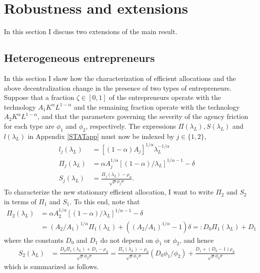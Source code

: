 \documentclass[11pt]{article}
\theoremstyle{plain}
\theoremstyle{definition} %
\begin{document}
\section{Robustness and extensions} \label{robust_app}

In this section I discuss two extensions of the main result. 

\subsection{Heterogeneous entrepreneurs} \label{hetero_ent}

In this section I show how the characterization of efficient allocations and the above decentralization change in the presence of two types of entrepreneurs. Suppose that a fraction $\zeta \in [0,1]$ of the entrepreneurs operate with the technology $A_1K^{\alpha}L^{1-\alpha}$ and the remaining fraction operate with the technology $A_2K^{\alpha}L^{1-\alpha}$, and that the parameters governing the severity of the agency friction for each type are $\phi_1$ and $\phi_2$, respectively. The expressions $\Pi(\lambda_L), S(\lambda_L)$ and $l(\lambda_L)$ in Appendix \ref{STATapp} must now be indexed by $j \in \{1,2\}$,
\begin{align*}
l_j(\lambda_L) & = [(1-\alpha)A_j]^{1/\alpha}\lambda_L^{-1/\alpha}
\\ \Pi_j(\lambda_L) & = \alpha A_j^{1/\alpha} [(1-\alpha)/\lambda_L]^{1/\alpha-1} - \delta
\\ S_j(\lambda_L) & = \frac{\Pi_j(\lambda_L) - \rho_S}{\sqrt{\rho} \phi_j \sigma}.
\end{align*}
To characterize the new stationary efficient allocation, I want to write $\Pi_2$ and $S_2$ in terms of $\Pi_1$ and $S_1$. To this end, note that
\begin{equation}
\begin{aligned}
\Pi_2(\lambda_L) & = \alpha A_2^{1/\alpha} [(1-\alpha)/\lambda_L]^{1/\alpha-1} - \delta
\\ & = (A_2/A_1)^{1/\alpha} \Pi_1(\lambda_L) + ((A_2/A_1)^{1/\alpha}-1)\delta
=: D_0\Pi_1(\lambda_L) + D_1
\end{aligned}
\label{pinned}
\end{equation}
where the constants $D_0$ and $D_1$ do not depend on $\phi_1$ or $\phi_2$, and hence
\begin{align*} %
S_2(\lambda_L) & = \frac{D_0\Pi_1(\lambda_L) + D_1 - \rho_S}{\sqrt{\rho} \phi_2 \sigma}
 = \frac{\Pi_1(\lambda_L) - \rho_S}{\sqrt{\rho} \phi_1 \sigma} (D_0\phi_1/\phi_2) + \frac{D_1 + (D_0 - 1)\rho_S}{\sqrt{\rho} \phi_2 \sigma} 
\end{align*}
which is summarized as follows. 
\end{document}
